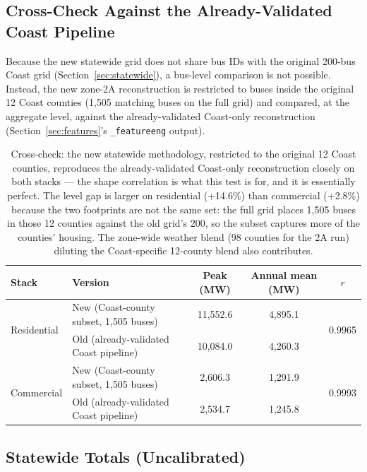 \documentclass[11pt]{article}
\begin{document}
\subsection{Cross-Check Against the Already-Validated Coast Pipeline}
\label{sec:crosscheck}

Because the new statewide grid does not share bus IDs with the original 200-bus Coast
grid (Section~\ref{sec:statewide}), a bus-level comparison is not possible. Instead,
the new zone-2A reconstruction is restricted to buses inside the original 12 Coast
counties (1{,}505 matching buses on the full grid) and compared, at the aggregate
level, against the already-validated Coast-only reconstruction
(Section~\ref{sec:features}'s \texttt{\_featureeng} output).

\begin{table}[H]
\centering
\small
\begin{tabular}{llccc}
\toprule
Stack & Version & Peak (MW) & Annual mean (MW) & $r$ \\
\midrule
\multirow{2}{*}{Residential} & New (Coast-county subset, 1{,}505 buses) & 11{,}552.6 & 4{,}895.1 & \multirow{2}{*}{0.9965} \\
 & Old (already-validated Coast pipeline) & 10{,}084.0 & 4{,}260.3 & \\
\midrule
\multirow{2}{*}{Commercial} & New (Coast-county subset, 1{,}505 buses) & 2{,}606.3 & 1{,}291.9 & \multirow{2}{*}{0.9993} \\
 & Old (already-validated Coast pipeline) & 2{,}534.7 & 1{,}245.8 & \\
\bottomrule
\end{tabular}
\caption{Cross-check: the new statewide methodology, restricted to the original 12
Coast counties, reproduces the already-validated Coast-only reconstruction closely on
both stacks --- the shape correlation is what this test is for, and it is essentially
perfect. The level gap is larger on residential (+14.6\%) than commercial (+2.8\%)
because the two footprints are not the same set: the full grid places 1{,}505 buses in
those 12 counties against the old grid's 200, so the subset captures more of the
counties' housing. The zone-wide weather blend (98 counties for the 2A run) diluting
the Coast-specific 12-county blend also contributes.}
\label{tab:crosscheck}
\end{table}

\subsection{Statewide Totals (Uncalibrated)}
\end{document}
